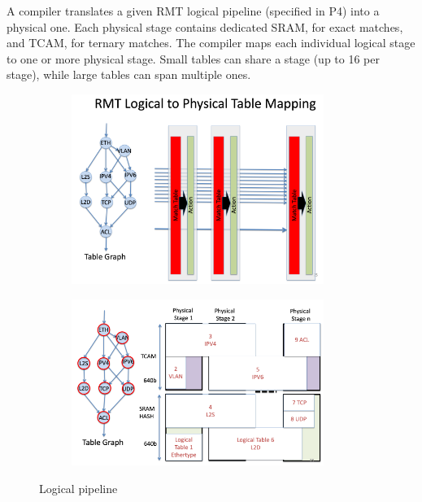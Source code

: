 \documentclass[11pt,oneside,a4paper]{article}
\begin{document}
A compiler translates a given RMT logical pipeline (specified in P4) into a physical one. Each physical stage contains dedicated SRAM, for exact matches, and TCAM, for ternary matches. The compiler maps each individual logical stage to one or more physical stage. Small tables can share a stage (up to 16 per stage), while large tables can span multiple ones.\\

\begin{figure}[hb]
	\centering
	\begin{subfigure}[t]{.5\textwidth}
		\centering
		\includegraphics[width=0.9\textwidth,scale=1]{figures/rmt_logical_pipeline}
		\label{fig:rmt_logical_pipeline}
	\end{subfigure}%
	\begin{subfigure}[t]{.5\textwidth}
		\centering
		\includegraphics[width=0.9\textwidth,scale=1]{figures/rmt_physical_stages}
		\label{fig:rmt_physical_stages}
	\end{subfigure}
	\caption{Logical pipeline \cite{gibb2013design}}
\end{figure}
\end{document}
